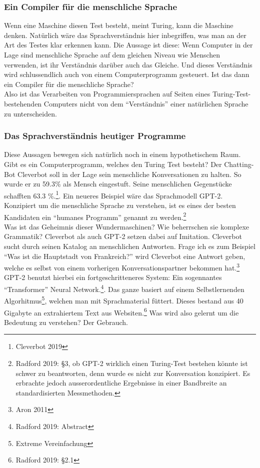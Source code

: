 \documentclass[10pt,a4paper]{article}
\begin{document}
\subsubsection{Ein Compiler für die menschliche Sprache}
Wenn eine Maschine diesen Test besteht, meint Turing, kann die Maschine denken. Natürlich wäre das Sprachverständnis hier inbegriffen, was man an der Art des Testes klar erkennen kann. Die Aussage ist diese: Wenn Computer in der Lage sind menschliche Sprache auf dem gleichen Niveau wie Menschen verwenden, ist ihr Verständnis darüber auch das Gleiche. Und dieses Verständnis wird schlussendlich auch von einem Computerprogramm gesteuert. Ist das dann ein Compiler für die menschliche Sprache? \\
Also ist das Verarbeiten von Programmiersprachen auf Seiten eines Turing-Test-bestehenden Computers nicht von dem \enquote{Verständnis} einer natürlichen Sprache zu unterscheiden. \\


\subsubsection{Das Sprachverständnis heutiger Programme}
Diese Aussagen bewegen sich natürlich noch in einem hypothetischem Raum. Gibt es ein Computerprogramm, welches den Turing Test besteht? Der Chatting-Bot Cleverbot soll in der Lage sein menschliche Konversationen zu halten. So wurde er zu 59.3\% als Mensch eingestuft. Seine menschlichen Gegenstücke schafften 63.3 \%.\footnote{Cleverbot 2019}. Ein neueres Beispiel wäre das Sprachmodell GPT-2. Konzipiert um die menschliche Sprache zu verstehen, ist es eines der besten Kandidaten ein \enquote{humanes Programm} genannt zu werden.\footnote{Radford 2019: §3, ob GPT-2 wirklich einen Turing-Test bestehen könnte ist schwer zu beantworten, denn wurde es nicht zur Konversation konzipiert. Es erbrachte jedoch ausserordentliche Ergebnisse in einer Bandbreite an standardisierten Messmethoden.} \\
Was ist das Geheimnis dieser Wundermaschinen? Wie beherrschen sie komplexe Grammatik? Cleverbot als auch GPT-2 setzen dabei auf Imitation. Cleverbot sucht durch seinen Katalog an menschlichen Antworten. Frage ich es zum Beispiel \enquote{Was ist die Hauptstadt von Frankreich?} wird Cleverbot eine Antwort geben, welche es selbst von einem vorherigen Konversationspartner bekommen hat.\footnote{Aron 2011} GPT-2 benutzt hierbei ein fortgeschritteneres System: Ein sogennantes \enquote{Transformer} Neural Network.\footnote{Radford 2019: Abstract}. Das ganze basiert auf einem Selbstlernenden Algorhitmus\footnote{Extreme Vereinfachung}, welchen man mit Sprachmaterial füttert. Dieses bestand aus 40 Gigabyte an extrahiertem Text aus Websiten.\footnote{Radford 2019: §2.1} Was wird also gelernt um die Bedeutung zu verstehen? Der Gebrauch.
\end{document}
